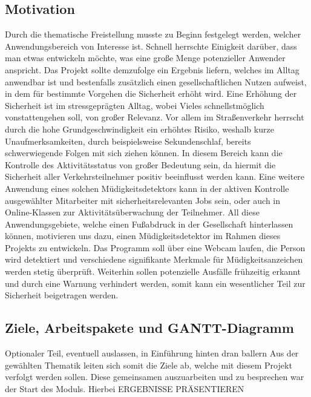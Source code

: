 \subsection{Motivation}
Durch die thematische Freistellung musste zu Beginn festgelegt werden, welcher Anwendungsbereich von Interesse ist. Schnell herrschte Einigkeit darüber, dass man etwas entwickeln möchte, was eine große Menge potenzieller Anwender anspricht. Das Projekt sollte demzufolge ein Ergebnis liefern, welches im Alltag anwendbar ist und bestenfalls zusätzlich einen gesellschaftlichen Nutzen aufweist, in dem für bestimmte Vorgehen die Sicherheit erhöht wird. Eine Erhöhung der Sicherheit ist im stressgeprägten Alltag, wobei Vieles schnellstmöglich vonstattengehen soll, von großer Relevanz. Vor allem im Straßenverkehr herrscht durch die hohe Grundgeschwindigkeit ein erhöhtes Risiko, weshalb kurze Unaufmerksamkeiten, durch beispielsweise Sekundenschlaf, bereits schwerwiegende Folgen mit sich ziehen können. In diesem Bereich kann die Kontrolle des Aktivitätsstatus von großer Bedeutung sein, da hiermit die Sicherheit aller Verkehrsteilnehmer positiv beeinflusst werden kann. Eine weitere Anwendung eines solchen Müdigkeitsdetektors kann in der aktiven Kontrolle ausgewählter Mitarbeiter mit sicherheitsrelevanten Jobs sein, oder auch in Online-Klassen zur Aktivitätsüberwachung der Teilnehmer. All diese Anwendungsgebiete, welche einen Fußabdruck in der Gesellschaft hinterlassen können, motivieren uns dazu, einen Müdigkeitsdetektor im Rahmen dieses Projekts zu entwickeln. Das Programm soll über eine Webcam laufen, die Person wird detektiert und verschiedene signifikante Merkmale für Müdigkeitsanzeichen werden stetig überprüft. Weiterhin sollen potenzielle Ausfälle frühzeitig erkannt und durch eine Warnung verhindert werden, somit kann ein wesentlicher Teil zur Sicherheit beigetragen werden.

\subsection{Ziele, Arbeitspakete und GANTT-Diagramm}
Optionaler Teil, eventuell auslassen, in Einführung hinten dran ballern
Aus der gewählten Thematik leiten sich somit die Ziele ab, welche mit diesem Projekt verfolgt werden sollen. Diese gemeinsamen auszuarbeiten und zu besprechen war der Start des Moduls. Hierbei ERGEBNISSE PRÄSENTIEREN

